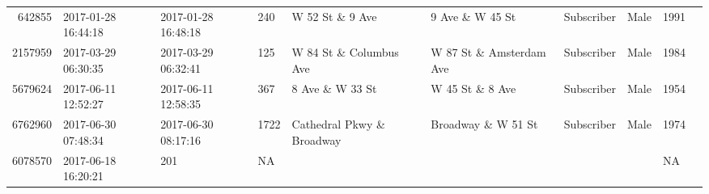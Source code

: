 \documentclass[11pt]{article}
\begin{document}
\begin{description}
\begin{tabular}{r|lllllllll}
	  642855                       & 2017-01-28 16:44:18           & 2017-01-28 16:48:18           &  240                          & W 52 St \& 9 Ave             & 9 Ave \& W 45 St             & Subscriber                    & Male                          & 1991                         \\
	 2157959                       & 2017-03-29 06:30:35           & 2017-03-29 06:32:41           &  125                          & W 84 St \& Columbus Ave      & W 87 St  \& Amsterdam Ave    & Subscriber                    & Male                          & 1984                         \\
	 5679624                       & 2017-06-11 12:52:27           & 2017-06-11 12:58:35           &  367                          & 8 Ave \& W 33 St             & W 45 St \& 8 Ave             & Subscriber                    & Male                          & 1954                         \\
	 6762960                       & 2017-06-30 07:48:34           & 2017-06-30 08:17:16           & 1722                          & Cathedral Pkwy \& Broadway   & Broadway \& W 51 St          & Subscriber                    & Male                          & 1974                         \\
	 6078570                     & 2017-06-18 16:20:21         & 201                         &   NA                        &                             &                             &                             &                             &   NA                       \\
\end{tabular}


\end{description}
\end{document}
